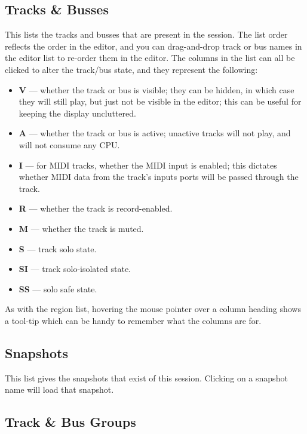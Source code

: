 \documentclass[10pt,a4paper]{book}
\begin{document}
{\subsection{Tracks \& Busses}

This lists the tracks and busses that are present in the session.  The
list order reflects the order in the editor, and you can drag-and-drop
track or bus names in the editor list to re-order them in the editor.
The columns in the list can all be clicked to alter the track/bus
state, and they represent the following:

\begin{itemize}
\item \textbf{V} --- whether the track or bus is visible; they can be
  hidden, in which case they will still play, but just not be visible
  in the editor; this can be useful for keeping the display uncluttered.
\item \textbf{A} --- whether the track or bus is active; unactive
  tracks will not play, and will not consume any CPU\@.
\item \textbf{I} --- for MIDI tracks, whether the MIDI input is
  enabled; this dictates whether MIDI data from the track's inputs
  ports will be passed through the track.
\item \textbf{R} --- whether the track is record-enabled.
\item \textbf{M} --- whether the track is muted.
\item \textbf{S} --- track solo state.
\item \textbf{SI} --- track solo-isolated state.
\item \textbf{SS} --- solo safe state.
\end{itemize}

As with the region list, hovering the mouse pointer over a column
heading shows a tool-tip which can be handy to remember what the
columns are for.

\subsection{Snapshots}

This list gives the snapshots that exist of this session.  Clicking on
a snapshot name will load that snapshot.

\subsection{Track \& Bus Groups}

}
\end{document}

